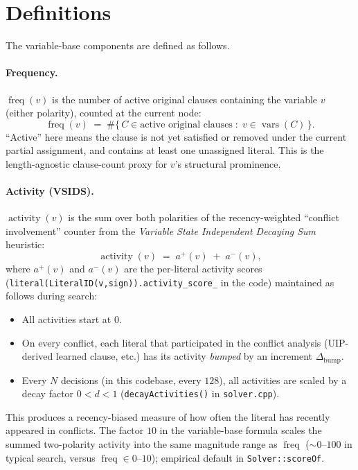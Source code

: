 \documentclass[11pt]{article}
\begin{document}
\section{Definitions}

\noindent The variable-base components are defined as follows.

\paragraph{Frequency.}
$\operatorname{freq}(v)$ is the number of active original clauses containing
the variable $v$ (either polarity), counted at the current node:
\[
\operatorname{freq}(v) \;=\; \#\bigl\{\, C \in \text{active original clauses}
\;:\; v \in \operatorname{vars}(C) \,\bigr\}.
\]
``Active'' here means the clause is not yet satisfied or removed under the
current partial assignment, and contains at least one unassigned literal.
This is the length-agnostic clause-count proxy for $v$'s structural
prominence.

\paragraph{Activity (VSIDS).}
$\operatorname{activity}(v)$ is the sum over both polarities of the
recency-weighted ``conflict involvement'' counter from the
\emph{Variable State Independent Decaying Sum} heuristic:
\[
\operatorname{activity}(v) \;=\; a^{+}(v) \;+\; a^{-}(v),
\]
where $a^{+}(v)$ and $a^{-}(v)$ are the per-literal activity scores
(\texttt{literal(LiteralID(v,sign)).activity\_score\_} in the code) maintained
as follows during search:
\begin{itemize}
	\item All activities start at $0$.
	\item On every conflict, each literal that participated in the conflict
	analysis (UIP-derived learned clause, etc.) has its activity
	\emph{bumped} by an increment $\Delta_{\mathrm{bump}}$.
	\item Every $N$ decisions (in this codebase, every $128$), all activities
	are scaled by a decay factor $0 < d < 1$
	(\texttt{decayActivities()} in \texttt{solver.cpp}).
\end{itemize}
This produces a recency-biased measure of how often the literal has
recently appeared in conflicts. The factor $10$ in the variable-base
formula scales the summed two-polarity activity into the same magnitude
range as $\operatorname{freq}$ ($\sim 0\text{--}100$ in typical search,
versus $\operatorname{freq} \in 0\text{--}10$); empirical default in
\texttt{Solver::scoreOf}.
\end{document}
